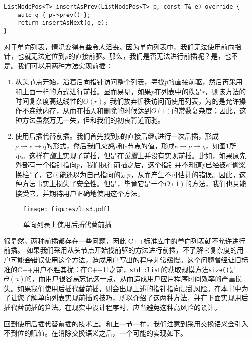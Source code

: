 \begin{lstlisting}
ListNodePos<T> insertAsPrev(ListNodePos<T> p, const T& e) override {
    auto q { p->prev() };
    return insertAsNext(q, e);
}
\end{lstlisting}

对于单向列表，情况变得有些令人沮丧。因为单向列表中，我们无法使用前向指针，也就无法定位到$p$的直接前驱。那么，我们是否无法进行前插呢？是，也不是。我们可以用两种方法实现前插：
\begin{enumerate}
    \item 从头节点开始，沿着后向指针访问整个列表，寻找$p$的直接前驱，然后再采用和上面一样的方式进行前插。显而易见，如果$p$在列表中的秩是$r$，则该方法的时间复杂度高达线性的$\Theta(r)$。我们放弃循秩访问而使用列表，为的是允许操作不连续内存，从而在插入和删除的时候达到$O(1)$的常数复杂度；因此，这种方法虽然万无一失，但和我们的初衷背道而驰。
    \item 使用后插代替前插。我们首先找到$p$的直接后继$q$进行一次后插，形成$p\rightarrow e\rightarrow q$的形式，然后我们\textit{交换}$p$和$e$节点的值，形成$e\rightarrow p\rightarrow q$，如图\ref{fig:lis3}所示。这样在\textit{值}上实现了前插，但是在\textit{位置}上并没有实现前插。比如，如果原先外部有一个指针指向$p$，我们执行前插之后，这个指针并不知道$p$已经被$e$“偷梁换柱”了，它可能还以为自己指向的是$p$，从而产生不可估计的错误。因此，这种方法事实上损失了安全性。但是，毕竟它是一个$O(1)$的方法，我们也只能接受它，并期待用户正确地使用这个方法。
\end{enumerate}

\begin{figure}
  \centering
  \texttt{[image: figures/lis3.pdf]}
  \caption{单向列表上使用后插代替前插}
  \label{fig:lis3}
\end{figure}

很显然，两种前插都存在一些问题，因此
C++标准库中的单向列表就不允许进行前插。
如果我们采用从头节点开始找前驱的方法进行前插，不了解它复杂度的用户可能会错误使用这个方法，造成用户写出的程序非常缓慢。这个问题曾经让旧标准的C++用户不胜其扰：在C++11之前，\lstinline{std::list}的获取规模方法\lstinline{size()}是$\Theta(n)$的，而用户很容易忘记这一点，从而造成用户应用程序时间效率的严重损失。如果我们使用后插代替前插，则会出现上述的指针指向混乱风险。在本书中为了让您了解单向列表实现前插的技巧，所以介绍了这两种方法，并在下面实现用后插代替前插的算法。在现实中设计程序时，应当避免这种高风险的设计。

回到使用后插代替前插的技术上。和上一节一样，我们注意到采用交换语义会引入不到位的赋值。在消除交换语义之后，一个可能的实现如下。

